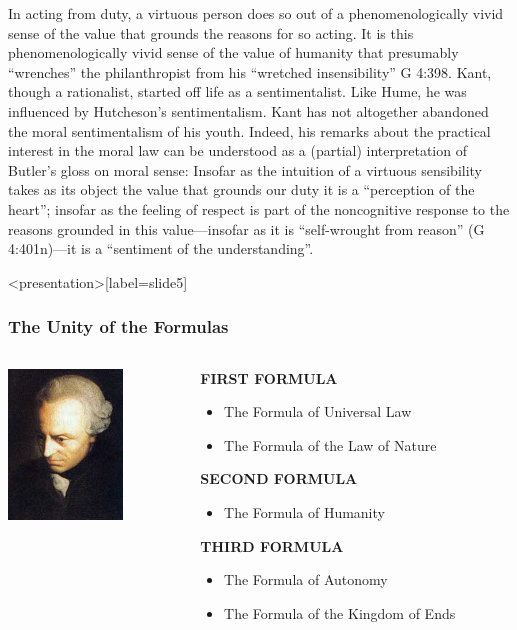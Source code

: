 In acting from duty, a virtuous person does so out of a phenomenologically vivid sense of the value that grounds the reasons for so acting. It is this phenomenologically vivid sense of the value of humanity that presumably ``wrenches'' the philanthropist from his ``wretched insensibility'' G 4:398. Kant, though a rationalist, started off life as a sentimentalist. Like Hume, he was influenced by Hutcheson's sentimentalism. Kant has not altogether abandoned the moral sentimentalism of his youth. Indeed, his remarks about the practical interest in the moral law can be understood as a (partial) interpretation of Butler's gloss on moral sense: Insofar as the intuition of a virtuous sensibility takes as its object the value that grounds our duty it is a ``perception of the heart''; insofar as the feeling of respect is part of the noncognitive response to the reasons grounded in this value---insofar as it is ``self-wrought from reason'' (G 4:401n)---it is a ``sentiment of the understanding''.

\begin{frame}<presentation>[label=slide5]
    \frametitle{The Unity of the Formulas}
        \begin{columns}
            \begin{column}{3cm}
                \includegraphics[height=4cm]{../../graphics/kant.jpg}
            \end{column}
            \begin{column}{7cm}
                \small{\textbf{FIRST FORMULA}}
                \begin{itemize}
                    \item \small{\alert{The Formula of Universal Law}}
                    \item \small{\alert{The Formula of the Law of Nature}}
                \end{itemize}
                \small{\textbf{SECOND FORMULA}}
                \begin{itemize}
                    \item \small{\alert{The Formula of Humanity}}
                \end{itemize}
                \small{\textbf{THIRD FORMULA}}
                \begin{itemize}
                    \item \small{\alert{The Formula of Autonomy}}
                    \item \small{\alert{The Formula of the Kingdom of Ends}}
                \end{itemize}
            \end{column}
        \end{columns}
\end{frame}


